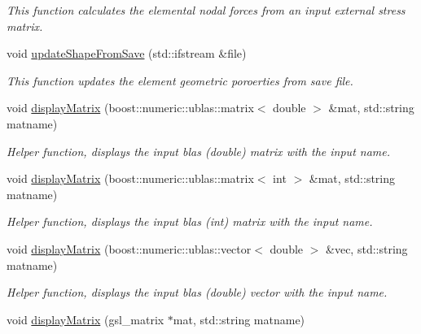 \begin{DoxyCompactItemize}
\begin{DoxyCompactList}\small\item\em This function calculates the elemental nodal forces from an input external stress matrix. \end{DoxyCompactList}\item 
\hypertarget{classShapeBase_a570d553851b58e0c12f45f2d70344eea}{}void \hyperlink{classShapeBase_a570d553851b58e0c12f45f2d70344eea}{update\+Shape\+From\+Save} (std\+::ifstream \&file)\label{classShapeBase_a570d553851b58e0c12f45f2d70344eea}

\begin{DoxyCompactList}\small\item\em This function updates the element geometric poroerties from save file. \end{DoxyCompactList}\item 
\hypertarget{classShapeBase_aef1912b0fe9cfe98ed4b377774c2f0c7}{}void \hyperlink{classShapeBase_aef1912b0fe9cfe98ed4b377774c2f0c7}{display\+Matrix} (boost\+::numeric\+::ublas\+::matrix$<$ double $>$ \&mat, std\+::string matname)\label{classShapeBase_aef1912b0fe9cfe98ed4b377774c2f0c7}

\begin{DoxyCompactList}\small\item\em Helper function, displays the input blas (double) matrix with the input name. \end{DoxyCompactList}\item 
\hypertarget{classShapeBase_a2b74c35e2d5a2abed9c521c735f1954a}{}void \hyperlink{classShapeBase_a2b74c35e2d5a2abed9c521c735f1954a}{display\+Matrix} (boost\+::numeric\+::ublas\+::matrix$<$ int $>$ \&mat, std\+::string matname)\label{classShapeBase_a2b74c35e2d5a2abed9c521c735f1954a}

\begin{DoxyCompactList}\small\item\em Helper function, displays the input blas (int) matrix with the input name. \end{DoxyCompactList}\item 
\hypertarget{classShapeBase_a662efa15155aa6e90ccc1102563dada8}{}void \hyperlink{classShapeBase_a662efa15155aa6e90ccc1102563dada8}{display\+Matrix} (boost\+::numeric\+::ublas\+::vector$<$ double $>$ \&vec, std\+::string matname)\label{classShapeBase_a662efa15155aa6e90ccc1102563dada8}

\begin{DoxyCompactList}\small\item\em Helper function, displays the input blas (double) vector with the input name. \end{DoxyCompactList}\item 
\hypertarget{classShapeBase_abb781fb01957dfb519eb1863bb64d7ab}{}void \hyperlink{classShapeBase_abb781fb01957dfb519eb1863bb64d7ab}{display\+Matrix} (gsl\+\_\+matrix $\ast$mat, std\+::string matname)\label{classShapeBase_abb781fb01957dfb519eb1863bb64d7ab}


\end{DoxyCompactItemize}
